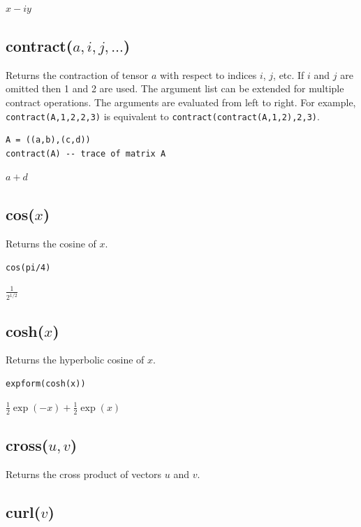 $x - i y$

\subsection*{contract($a,i,j,\ldots$)}

Returns the contraction of tensor $a$ with respect to indices $i$, $j$, etc.
If $i$ and $j$ are omitted then 1 and 2 are used.
The argument list can be extended for multiple contract operations.
The arguments are evaluated from left to right.
For example, {\tt contract(A,1,2,2,3)} is equivalent to {\tt contract(contract(A,1,2),2,3)}.

{\color{blue}
\begin{verbatim}
A = ((a,b),(c,d))
contract(A) -- trace of matrix A
\end{verbatim}
}

$a + d$

\subsection*{cos($x$)}

Returns the cosine of $x$.

{\color{blue}
\begin{verbatim}
cos(pi/4)
\end{verbatim}
}

$\displaystyle \frac{1}{2^{1/2}}$

\subsection*{cosh($x$)}

Returns the hyperbolic cosine of $x$.

{\color{blue}
\begin{verbatim}
expform(cosh(x))
\end{verbatim}
}

$\tfrac{1}{2}\exp(-x)+\tfrac{1}{2}\exp(x)$

\subsection*{cross($u,v$)}

Returns the cross product of vectors $u$ and $v$.

\subsection*{curl($v$)}

